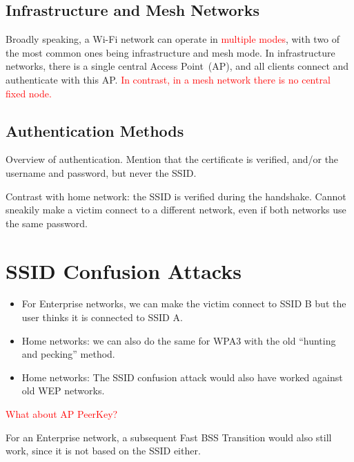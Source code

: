 \documentclass[sigconf,review]{acmart}
\newcommand{\wifi}{\mbox{Wi-Fi}}
\DeclareRobustCommand{\red}[1]{\textcolor{red}{#1}}
\begin{document}
\subsection{Infrastructure and Mesh Networks}

Broadly speaking, a \wifi{} network can operate in \red{multiple modes}, with two of the most common ones being infrastructure and mesh mode.
In infrastructure networks, there is a single central Access Point~(AP), and all clients connect and authenticate with this AP.
\red{In contrast, in a mesh network there is no central fixed node.}

\subsection{Authentication Methods}

Overview of authentication. Mention that the certificate is verified, and/or the username and password, but never the SSID.

Contrast with home network: the SSID is verified during the handshake.
Cannot sneakily make a victim connect to a different network, even if both networks use the same password.

\section{SSID Confusion Attacks}
\label{sec:improvedinjection}



\begin{itemize}
	\item For Enterprise networks, we can make the victim connect to SSID B but the user thinks it is connected to SSID A.

	\item Home networks: we can also do the same for WPA3 with the old ``hunting and pecking'' method.
	
	\item Home networks: The SSID confusion attack would also have worked against old WEP networks.
\end{itemize}


\red{What about AP PeerKey?}

For an Enterprise network, a subsequent Fast BSS Transition would also still work, since it is not based on the SSID either.
\end{document}
